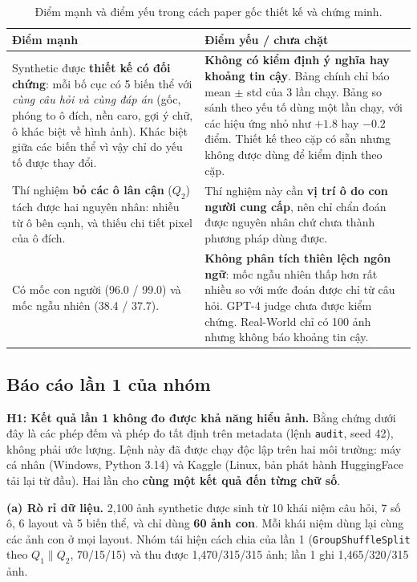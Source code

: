 \documentclass[12pt]{ai_conquer2026}
\begin{document}
\begin{table}[h!]
\centering
\small
\caption{Điểm mạnh và điểm yếu trong cách paper gốc thiết kế và chứng minh.}
\label{tab:paper}
\begin{tabularx}{\textwidth}{|Y|Y|}
\hline
\textbf{Điểm mạnh} & \textbf{Điểm yếu / chưa chặt} \\ \hline
Synthetic được \textbf{thiết kế có đối chứng}: mỗi bố cục có 5 biến thể với \emph{cùng câu hỏi và cùng đáp án} (gốc, phóng to ô đích, nền caro, gợi ý chữ, ô khác biệt về hình ảnh). Khác biệt giữa các biến thể vì vậy chỉ do yếu tố được thay đổi. &
\textbf{Không có kiểm định ý nghĩa hay khoảng tin cậy}. Bảng chính chỉ báo mean $\pm$ std của 3 lần chạy. Bảng so sánh theo yếu tố dùng một lần chạy, với các hiệu ứng nhỏ như $+1.8$ hay $-0.2$ điểm. Thiết kế theo cặp có sẵn nhưng không được dùng để kiểm định theo cặp. \\ \hline
Thí nghiệm \textbf{bỏ các ô lân cận} ($Q_2$) tách được hai nguyên nhân: nhiễu từ ô bên cạnh, và thiếu chi tiết pixel của ô đích. &
Thí nghiệm này cần \textbf{vị trí ô do con người cung cấp}, nên chỉ chẩn đoán được nguyên nhân chứ chưa thành phương pháp dùng được. \\ \hline
Có mốc con người (96.0 / 99.0) và mốc ngẫu nhiên (38.4 / 37.7). &
\textbf{Không phân tích thiên lệch ngôn ngữ}: mốc ngẫu nhiên thấp hơn rất nhiều so với mức đoán được chỉ từ câu hỏi. GPT-4 judge chưa được kiểm chứng. Real-World chỉ có 100 ảnh nhưng không báo khoảng tin cậy. \\ \hline
\end{tabularx}
\end{table}

\subsection{Báo cáo lần 1 của nhóm}
\label{sec:h1}

\textbf{H1: Kết quả lần 1 không đo được khả năng hiểu ảnh.} Bằng chứng dưới đây là các phép đếm và phép đo tất định trên metadata (lệnh \texttt{audit}, seed 42), không phải ước lượng. Lệnh này đã được chạy độc lập trên hai môi trường: máy cá nhân (Windows, Python 3.14) và Kaggle (Linux, bản phát hành HuggingFace tải lại từ đầu). Hai lần cho \textbf{cùng một kết quả đến từng chữ số}.

\textbf{(a) Rò rỉ dữ liệu.} 2{,}100 ảnh synthetic được sinh từ 10 khái niệm câu hỏi, 7 số ô, 6 layout và 5 biến thể, và chỉ dùng \textbf{60 ảnh con}. Mỗi khái niệm dùng lại cùng các ảnh con ở mọi layout. Nhóm tái hiện cách chia của lần 1 (\texttt{GroupShuffleSplit} theo $Q_1\parallel Q_2$, 70/15/15) và thu được 1{,}470/315/315 ảnh; lần 1 ghi 1{,}465/320/315 ảnh.
\end{document}
